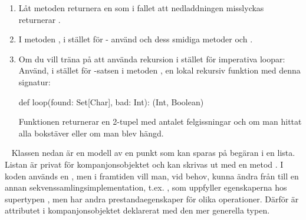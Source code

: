\begin{enumerate}
\item Låt metoden  returnera en  som i fallet att nedladdningen misslyckas returnerar .

\item I metoden , i stället för - använd  och dess smidiga metoder  och .

\item Om du vill träna på att använda rekursion i stället för imperativa loopar: Använd, i stället för -satsen i metoden , en lokal rekursiv funktion med denna signatur:
\begin{Code}
  def loop(found: Set[Char], bad: Int): (Int, Boolean)
\end{Code}
Funktionen  returnerar en 2-tupel med antalet felgissningar och  om man hittat alla bokstäver eller  om man blev hängd.

\end{enumerate}





\SOLUTION


\TaskSolved \what

\SubtaskSolved  {}

\SubtaskSolved  {}



\QUESTEND







\QUESTBEGIN

\Task  \what~
Klassen  nedan är en modell av en punkt som kan sparas på begäran i en lista. Listan är privat för kompanjonsobjektet och kan skrivas ut med en metod . I koden används en , men i framtiden vill man, vid behov, kunna ändra från  till en annan sekvenssamlingsimplementation, t.ex. , som uppfyller egenskaperna hos supertypen , men har andra prestandaegenskaper för olika operationer. Därför är attributet  i kompanjonsobjektet deklarerat med den mer generella typen.

